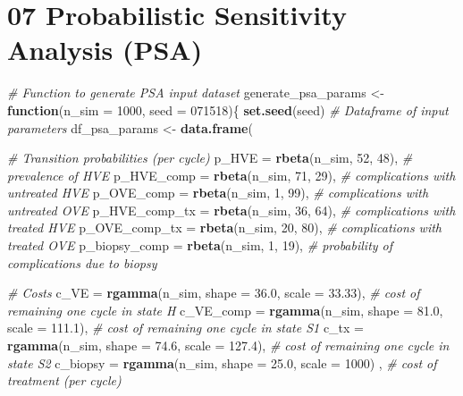 \documentclass[]{article}
\newenvironment{Shaded}{\begin{snugshade}}{\end{snugshade}}
\newcommand{\KeywordTok}[1]{\textcolor[rgb]{0.13,0.29,0.53}{\textbf{#1}}}
\newcommand{\DataTypeTok}[1]{\textcolor[rgb]{0.13,0.29,0.53}{#1}}
\newcommand{\DecValTok}[1]{\textcolor[rgb]{0.00,0.00,0.81}{#1}}
\newcommand{\FloatTok}[1]{\textcolor[rgb]{0.00,0.00,0.81}{#1}}
\newcommand{\StringTok}[1]{\textcolor[rgb]{0.31,0.60,0.02}{#1}}
\newcommand{\CommentTok}[1]{\textcolor[rgb]{0.56,0.35,0.01}{\textit{#1}}}
\newcommand{\ControlFlowTok}[1]{\textcolor[rgb]{0.13,0.29,0.53}{\textbf{#1}}}
\newcommand{\NormalTok}[1]{#1}
\begin{document}
\section{07 Probabilistic Sensitivity Analysis
(PSA)}\label{probabilistic-sensitivity-analysis-psa}

\begin{Shaded}
\begin{Highlighting}[]
\CommentTok{# Function to generate PSA input dataset}
\NormalTok{generate_psa_params <-}\StringTok{ }\ControlFlowTok{function}\NormalTok{(}\DataTypeTok{n_sim =} \DecValTok{1000}\NormalTok{, }\DataTypeTok{seed =} \DecValTok{071518}\NormalTok{)\{}
  \KeywordTok{set.seed}\NormalTok{(seed)}
  \CommentTok{# Dataframe of input parameters}
\NormalTok{  df_psa_params   <-}\StringTok{ }\KeywordTok{data.frame}\NormalTok{(}
    
    \CommentTok{# Transition probabilities (per cycle)}
    \DataTypeTok{p_HVE         =} \KeywordTok{rbeta}\NormalTok{(n_sim, }\DecValTok{52}\NormalTok{, }\DecValTok{48}\NormalTok{), }\CommentTok{# prevalence of HVE}
    \DataTypeTok{p_HVE_comp    =} \KeywordTok{rbeta}\NormalTok{(n_sim, }\DecValTok{71}\NormalTok{, }\DecValTok{29}\NormalTok{), }\CommentTok{# complications with untreated HVE}
    \DataTypeTok{p_OVE_comp    =} \KeywordTok{rbeta}\NormalTok{(n_sim,  }\DecValTok{1}\NormalTok{, }\DecValTok{99}\NormalTok{), }\CommentTok{# complications with untreated OVE}
    \DataTypeTok{p_HVE_comp_tx =} \KeywordTok{rbeta}\NormalTok{(n_sim, }\DecValTok{36}\NormalTok{, }\DecValTok{64}\NormalTok{), }\CommentTok{# complications with treated HVE}
    \DataTypeTok{p_OVE_comp_tx =} \KeywordTok{rbeta}\NormalTok{(n_sim, }\DecValTok{20}\NormalTok{, }\DecValTok{80}\NormalTok{), }\CommentTok{# complications with treated OVE}
    \DataTypeTok{p_biopsy_comp =} \KeywordTok{rbeta}\NormalTok{(n_sim,  }\DecValTok{1}\NormalTok{, }\DecValTok{19}\NormalTok{), }\CommentTok{# probability of complications due to biopsy}
    
    \CommentTok{# Costs}
    \DataTypeTok{c_VE      =} \KeywordTok{rgamma}\NormalTok{(n_sim, }\DataTypeTok{shape =} \FloatTok{36.0}\NormalTok{, }\DataTypeTok{scale =} \FloatTok{33.33}\NormalTok{), }\CommentTok{# cost of remaining one cycle in state H}
    \DataTypeTok{c_VE_comp =} \KeywordTok{rgamma}\NormalTok{(n_sim, }\DataTypeTok{shape =} \FloatTok{81.0}\NormalTok{, }\DataTypeTok{scale =} \FloatTok{111.1}\NormalTok{), }\CommentTok{# cost of remaining one cycle in state S1}
    \DataTypeTok{c_tx      =} \KeywordTok{rgamma}\NormalTok{(n_sim, }\DataTypeTok{shape =} \FloatTok{74.6}\NormalTok{, }\DataTypeTok{scale =} \FloatTok{127.4}\NormalTok{), }\CommentTok{# cost of remaining one cycle in state S2}
    \DataTypeTok{c_biopsy  =} \KeywordTok{rgamma}\NormalTok{(n_sim, }\DataTypeTok{shape =} \FloatTok{25.0}\NormalTok{, }\DataTypeTok{scale =} \DecValTok{1000}\NormalTok{) , }\CommentTok{# cost of treatment (per cycle)}
    

\end{Highlighting}
\end{Shaded}
\end{document}
